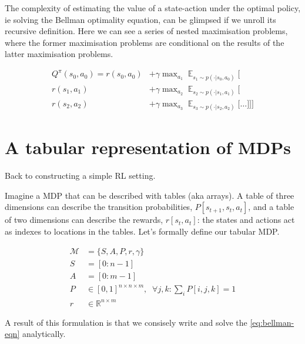 The complexity of estimating the value of a state-action under the optimal policy, ie solving the Bellman optimality
equation, can be glimpsed if we unroll its recursive definition.
Here we can see a series of nested maximisation problems, where the former
maximisation problems are conditional on the results of the latter maximisation problems.

\begin{align*}
Q^{\pi}(s_0, a_0) = r(s_0, a_0) &+ \gamma \mathop{\text{max}}_{a_1} \mathop{\mathbb E}_{s_1\sim p(\cdot | s_0, a_0)} \Bigg[ \\
r(s_1, a_1)  &+ \gamma \mathop{\text{max}}_{a_2} \mathop{\mathbb E}_{s_2\sim p(\cdot | s_1, a_1)} \bigg[\\
r(s_2, a_2)  &+ \gamma \mathop{\text{max}}_{a_3} \mathop{\mathbb E}_{s_3\sim p(\cdot | s_2, a_2)} \Big[
\dots \Big] \bigg] \Bigg]
\end{align*}

\section{A tabular representation of MDPs}

Back to constructing a simple RL setting.

Imagine a MDP that can be described with tables (aka arrays). A table of
three dimensions can describe the transition probabilities, $P[s_{t+1}, s_t, a_t]$,
and a table of two dimensions can describe the rewards, $r[s_t, a_t]$: the
states and actions act as indexes to locations in the tables.
Let's formally define our tabular MDP.

\begin{align}
\mathcal M &= \{S, A, P, r, \gamma\}\; \tag{the MDP}\\
S &= [0:n-1] \tag{the state space}\\
A &= [0:m-1] \tag{the action space}\\
P &\in [0,1]^{n\times n \times m}, \;\;\forall j, k : \sum_i P[i, j, k] = 1 \tag{the transition fn}\\
r &\in \mathbb R^{n\times m} \tag{the reward fn}
\end{align}

A result of this formulation is that we consisely write and solve the \eqref{eq:bellman-eqn} analytically. \footnotemark[1]


